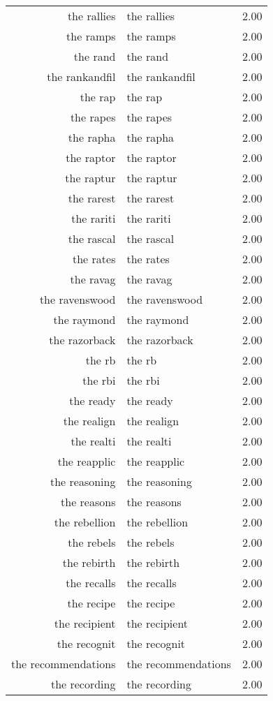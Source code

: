 \begin{table}[ht]
\begin{tabular}{rlr}
  the rallies & the rallies & 2.00 \\ 
  the ramps & the ramps & 2.00 \\ 
  the rand & the rand & 2.00 \\ 
  the rankandfil & the rankandfil & 2.00 \\ 
  the rap & the rap & 2.00 \\ 
  the rapes & the rapes & 2.00 \\ 
  the rapha & the rapha & 2.00 \\ 
  the raptor & the raptor & 2.00 \\ 
  the raptur & the raptur & 2.00 \\ 
  the rarest & the rarest & 2.00 \\ 
  the rariti & the rariti & 2.00 \\ 
  the rascal & the rascal & 2.00 \\ 
  the rates & the rates & 2.00 \\ 
  the ravag & the ravag & 2.00 \\ 
  the ravenswood & the ravenswood & 2.00 \\ 
  the raymond & the raymond & 2.00 \\ 
  the razorback & the razorback & 2.00 \\ 
  the rb & the rb & 2.00 \\ 
  the rbi & the rbi & 2.00 \\ 
  the ready & the ready & 2.00 \\ 
  the realign & the realign & 2.00 \\ 
  the realti & the realti & 2.00 \\ 
  the reapplic & the reapplic & 2.00 \\ 
  the reasoning & the reasoning & 2.00 \\ 
  the reasons & the reasons & 2.00 \\ 
  the rebellion & the rebellion & 2.00 \\ 
  the rebels & the rebels & 2.00 \\ 
  the rebirth & the rebirth & 2.00 \\ 
  the recalls & the recalls & 2.00 \\ 
  the recipe & the recipe & 2.00 \\ 
  the recipient & the recipient & 2.00 \\ 
  the recognit & the recognit & 2.00 \\ 
  the recommendations & the recommendations & 2.00 \\ 
  the recording & the recording & 2.00 \\ 

\end{tabular}
\end{table}
